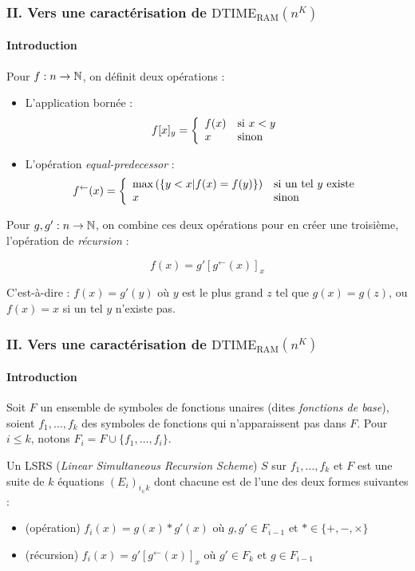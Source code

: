 \documentclass[10pt]{beamer}
\newcommand{\dtimeram}{\text{DTIME}_{\text{RAM}}\left( n^K \right)}
\newcommand{\eqpred}[3]{#1\left[ #2^{\leftarrow}(#3) \right]_{#3}}
\begin{document}
	\begin{frame}
		\frametitle{II. Vers une caractérisation de $\dtimeram$}
		\framesubtitle{Introduction}
		
		\begin{definition}
			Pour $f : n \to \mathbb{N}$, on définit deux opérations :
			
			\begin{itemize}
				\item 	L'application bornée :
				\[
				f[x]_y = \left\lbrace \begin{array}{ll} 
					f(x) & \text{si $x<y$} \\
					x 	& \text{sinon}
				 \end{array} \right.
				\]
				
				
				\item 	L'opération \emph{equal-predecessor} :
				\[
				f^{\leftarrow}(x) = \left\lbrace \begin{array}{ll} 
					\max\left(\left\lbrace y < x | f(x) = f(y)\right\rbrace\right) & \text{si un tel $y$ existe} \\
					x	& \text{sinon}
				 \end{array} \right.
				\]
			\end{itemize}
			
			Pour $g, g' : n \to \mathbb{N}$, on combine ces deux opérations pour en créer une troisième, l'opération de \emph{récursion} :
			
			\[
			f(x) = \eqpred{g'}{g}{x}
			\]
			
			C'est-à-dire : $f(x) = g'(y)$ où $y$ est le plus grand $z$ tel que $g(x) = g(z)$, ou $f(x) = x$ si un tel $y$ n'existe pas.
		\end{definition}

	\end{frame}
	
	\begin{frame}
		\frametitle{II. Vers une caractérisation de $\dtimeram$}
		\framesubtitle{Introduction}
				
		\begin{definition}[LSRS]
			\label{def:LSRS}
			Soit $F$ un ensemble de symboles de fonctions unaires (dites \emph{fonctions de base}), soient $f_1, \dots, f_k$ des symboles de fonctions qui n'apparaissent pas dans $F$. Pour $i\leqslant k$, notons $F_i = F\cup \{f_1, \dots, f_i\}$. 
			
			Un LSRS (\emph{Linear Simultaneous Recursion Scheme}) $S$ sur $f_1, \dots, f_k$ et $F$ est une suite de $k$ équations $\left(E_i\right)_{i_\in k}$ dont chacune est de l'une des deux formes suivantes :
			
			\begin{itemize}
				\item 	(opération) 		$f_i(x) = g(x) * g'(x)$ où $g,g' \in F_{i-1}$ et $* \in \{+, -, \times \}$
				
				\item 	(récursion)			$f_i(x) = \eqpred{g'}{g}{x}$ où $g' \in F_k$ et $g \in F_{i-1}$
			\end{itemize}
			
		\end{definition}
	\end{frame}
	
\end{document}
